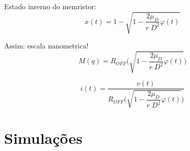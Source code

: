 \documentclass{ceel}
\begin{document}
\begin{multicols}{2}
Estado inrerno do memristor:
\begin{equation}\label{}
x(t)=1-\sqrt{1-\dfrac{2\mu_D}{r\; D^2}\varphi(t)}
\end{equation} 

Assim: escala nanometrica!
\begin{equation}\label{}
M(q)=R_{OFF}\Bigg(\sqrt{1-\dfrac{2\mu_D}{r\; D^2}\varphi(t) }\Bigg)
\end{equation}

\begin{equation}\label{}
i(t)=\dfrac{v(t)}{R_{OFF}\Bigg(\sqrt{1-\dfrac{2\mu_D}{r\; D^2}\varphi(t) }\Bigg)}
\end{equation} 



\section{Simulações} \label{sim}

\begin{figure}[H]
\centering


\end{figure}
\end{multicols}
\end{document}
